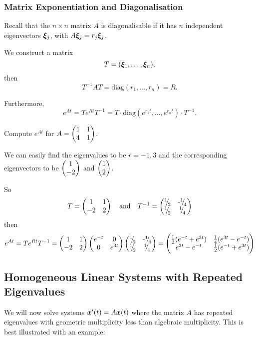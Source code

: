 \subsubsection{Matrix Exponentiation and Diagonalisation}\label{sec:diag}

Recall that the $n \times n$ matrix $A$ is diagonalisable if it has $n$ independent eigenvectors $\bm{\xi}_j$, with $A \bm{\xi}_j = r_j \bm{\xi}_j$.

We construct a matrix
\[
T = (\bm{\xi}_1, \ldots, \bm{\xi}_n),
\]
then
\[
T^{-1}AT = \text{diag}(r_1, \ldots, r_n) = R.
\]

Furthermore,
\[
e^{At} = T e^{Rt} T^{-1} = T \cdot \text{diag}(e^{r_1t}, \ldots, e^{r_nt}) \cdot T^{-1}.
\]

\begin{eg}
	Compute $e^{At}$ for $A = \begin{pmatrix}1 & 1 \\ 4 & 1\end{pmatrix}$.
	
	We can easily find the eigenvalues to be $r=-1,3$ and the corresponding eigenvectors to be $\begin{pmatrix}1 \\ -2\end{pmatrix}$ and $\begin{pmatrix}1 \\ 2\end{pmatrix}$.
	
	So
	\[
	T = \begin{pmatrix}1 & 1 \\ -2 & 2\end{pmatrix} \quad \text{and} \quad T^{-1} = \begin{pmatrix}{}^{1}{\mskip -5mu/\mskip -3mu}_{2} & \text{-}{}^{1}{\mskip -5mu/\mskip -3mu}_{4} \\ {}^{1}{\mskip -5mu/\mskip -3mu}_{2} & {}^{1}{\mskip -5mu/\mskip -3mu}_{4}\end{pmatrix}
	\]
	then
	\[
	e^{At} = Te^{Rt}T^{-1} = \begin{pmatrix}1 & 1 \\ -2 & 2\end{pmatrix} \begin{pmatrix}e^{-t} & 0 \\ 0 & e^{3t}\end{pmatrix} \begin{pmatrix}{}^{1}{\mskip -5mu/\mskip -3mu}_{2} & \text{-}{}^{1}{\mskip -5mu/\mskip -3mu}_{4} \\ {}^{1}{\mskip -5mu/\mskip -3mu}_{2} & {}^{1}{\mskip -5mu/\mskip -3mu}_{4}\end{pmatrix} = \begin{pmatrix}\frac12(e^{-t}+e^{3t}) & \frac14(e^{3t}-e^{-t}) \\ e^{3t}-e^{-t} & \frac12(e^{-t}+e^{3t})\end{pmatrix}
	\]
\end{eg}


\subsection{Homogeneous Linear Systems with Repeated Eigenvalues}\label{sec:repeatedeigs}

We will now solve systems $\bm{x}'(t) = A\bm{x}(t)$ where the matrix $A$ has repeated eigenvalues with geometric multiplicity less than algebraic multiplicity. This is best illustrated with an example:

